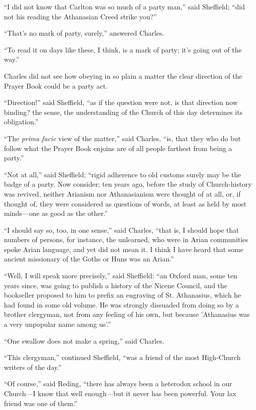 ``I did not know that Carlton was so much of a party man,''
said Sheffield; ``did not his reading the Athanasian Creed strike
you?''

``That's no mark of party, surely,'' answered Charles.

``To read it on days like these, I think, is a mark of party;
it's going out of the way.''

Charles did not see how obeying in so plain a matter the clear
direction of the Prayer Book could be a party act.

``Direction!'' said Sheffield, ``as if the question
were not, is that direction now binding? the sense, the understanding of the Church of this day determines its
obligation.''

``The \emph{prima facie} view of the matter,'' said
Charles, ``is, that they who do but follow what the Prayer Book
enjoins are of all people farthest from being a party.''

``Not at all,'' said Sheffield; ``rigid adherence to
old customs surely may be the badge of a party. Now consider; ten
years ago, before the study of Church-history was revived, neither
Arianism nor Athanasianism were thought of at all, or, if thought of,
they were considered as questions of words, at least as held by most
minds—one as good as the other.''

``I should say so, too, in one sense,'' said Charles,
``that is, I should hope that numbers of persons, for instance,
the unlearned, who were in Arian communities spoke Arian language, and
yet did not mean it. I think I have heard that some ancient missionary
of the Goths or Huns was an Arian.''

``Well, I will speak more precisely,'' said Sheffield:
``an Oxford man, some ten years since, was going to publish a
history of the Nicene Council, and the bookseller proposed to him to
prefix an engraving of St. Athanasius, which he had found in some old
volume. He was strongly dissuaded from doing so by a brother
clergyman, not from any feeling of his own, but because 'Athanasius
was a very unpopular name among us'.''

``One swallow does not make a spring,'' said Charles.

``This clergyman,'' continued Sheffield, ``was a friend
of the most High-Church writers of the day.''

``Of course,'' said Reding, ``there has always been a
heterodox school in our Church—I know that well enough—but
it never has been powerful. Your lax friend was one of them.''

